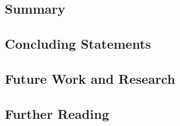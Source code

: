 \subsection{Summary}

\subsection{Concluding Statements}

\subsection{Future Work and Research}

\subsection{Further Reading}

